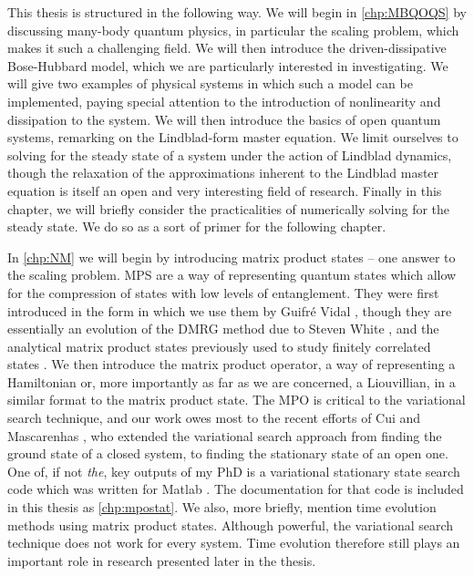This thesis is structured in the following way. We will begin in \cref{chp:MBQOQS} by discussing many-body quantum physics, in particular the scaling problem, which makes it such a challenging field. We will then introduce the driven-dissipative Bose-Hubbard model, which we are particularly interested in investigating. We will give two examples of physical systems in which such a model can be implemented, paying special attention to the introduction of nonlinearity and dissipation to the system. We will then introduce the basics of open quantum systems, remarking on the Lindblad-form master equation. We limit ourselves to solving for the steady state of a system under the action of Lindblad dynamics, though the relaxation of the approximations inherent to the Lindblad master equation is itself an open and very interesting field of research. Finally in this chapter, we will briefly consider the practicalities of numerically solving for the steady state. We do so as a sort of primer for the following chapter.

In \cref{chp:NM} we will begin by introducing matrix product states -- one answer to the scaling problem. MPS are a way of representing quantum states which allow for the compression of states with low levels of entanglement. They were first introduced in the form in which we use them by Guifr\'{e} Vidal \cite{Vidal2003,Vidal2004}, though they are essentially an evolution of the DMRG method due to Steven White \cite{White1992,White1993}, and the analytical matrix product states previously used to study finitely correlated states \cite{Affleck1987}. We then introduce the matrix product operator, a way of representing a Hamiltonian or, more importantly as far as we are concerned, a Liouvillian, in a similar format to the matrix product state. The MPO is critical to the variational search technique, and our work owes most to the recent efforts of Cui \cite{Cui2015} and Mascarenhas \cite{Mascarenhas2015}, who extended the variational search approach from finding the ground state of a closed system, to finding the stationary state of an open one. One of, if not \emph{the}, key outputs of my PhD is a variational stationary state search code \cite{otb:gitVSSS} which was written for Matlab \cite{MATLAB}. The documentation for that code is included in this thesis as \cref{chp:mpostat}. We also, more briefly, mention time evolution methods using matrix product states. Although powerful, the variational search technique does not work for every system. Time evolution therefore still plays an important role in research presented later in the thesis.

